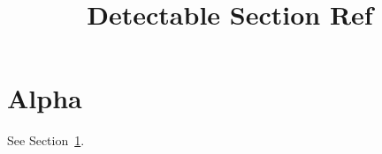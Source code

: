 \documentclass[letterpaper]{article}
\begin{document}
\title{Detectable Section Ref}\author{}\date{}\maketitle
\section{Alpha}\label{sec:alpha}
See Section~\ref{sec:alpha}.
\end{document}
